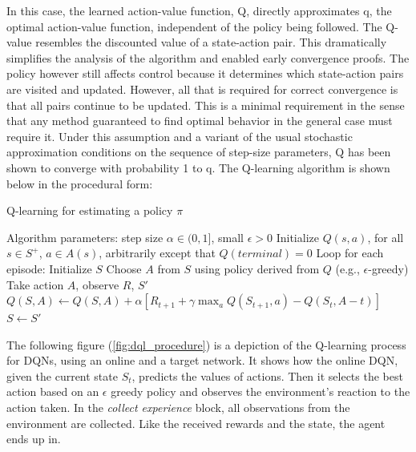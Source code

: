 \documentclass[12pt,a4paper]{article}
\begin{document}
In this case, the learned action-value function, Q, directly approximates q, the optimal
action-value function, independent of the policy being followed. The Q-value resembles the discounted value of a state-action pair. This dramatically
simplifies the analysis of the algorithm and enabled early convergence proofs. The policy however
still affects control because it determines which state-action pairs are visited and updated.
However, all that is required for correct convergence is that all pairs continue to be
updated. This is a minimal requirement in the sense that
any method guaranteed to find optimal behavior in the general case must require it.
Under this assumption and a variant of the usual stochastic approximation conditions on
the sequence of step-size parameters, Q has been shown to converge with probability 1 to
q. The Q-learning algorithm is shown below in the procedural form\cite{Sutton2015}:
\begin{algorithm}
    \caption{Q-learning for estimating a policy $\pi$}
    \begin{algorithmic}
    \State Algorithm parameters: step size $\alpha \in (0, 1]$, small  $\epsilon > 0$
    \State Initialize $Q(s,a)$, for all $s\in S^+$, $a\in A(s)$, arbitrarily except that $Q(terminal)=0$
    \State Loop for each episode:
        \State Initialize $S$
            \State Choose $A$ from $S$ using policy derived from $Q$ (e.g., $\epsilon$-greedy)
            \State Take action $A$, observe $R$, $S'$
            \State $Q(S, A) \leftarrow Q(S, A) + \alpha [R_{t+1}+\gamma \max_aQ(S_{t+1},a)-Q(S_t,A-t)]$
            \State $S \leftarrow S'$
        \EndFor
    \EndWhile
    \end{algorithmic}
\end{algorithm}

The following figure (\ref{fig:dql_procedure}) is a depiction of the Q-learning process for DQNs, using an online and a target network. It shows how the online DQN, given the current state $S_t$, predicts the values of actions. Then it selects the best action based on an $\epsilon$ greedy policy and observes the environment's reaction to the action taken. In the {\it collect experience} block, all observations from the environment are collected. Like the received rewards and the state, the agent ends up in.
\end{document}
